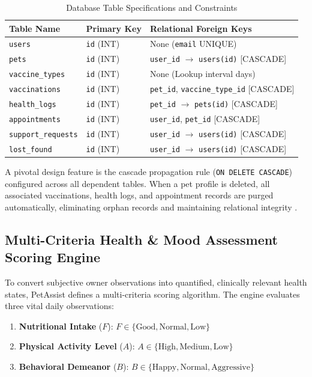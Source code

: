 \documentclass[conference]{IEEEtran}
\begin{document}
\begin{table}[h]
\caption{Database Table Specifications and Constraints}
\label{tab:db_tables}
\centering
\begin{tabular}{lll}
\toprule
\textbf{Table Name} & \textbf{Primary Key} & \textbf{Relational Foreign Keys} \\
\midrule
\texttt{users} & \texttt{id} (INT) & None (\texttt{email} UNIQUE) \\
\texttt{pets} & \texttt{id} (INT) & \texttt{user\_id} $\to$ \texttt{users(id)} [CASCADE] \\
\texttt{vaccine\_types} & \texttt{id} (INT) & None (Lookup interval days) \\
\texttt{vaccinations} & \texttt{id} (INT) & \texttt{pet\_id}, \texttt{vaccine\_type\_id} [CASCADE] \\
\texttt{health\_logs} & \texttt{id} (INT) & \texttt{pet\_id} $\to$ \texttt{pets(id)} [CASCADE] \\
\texttt{appointments} & \texttt{id} (INT) & \texttt{user\_id}, \texttt{pet\_id} [CASCADE] \\
\texttt{support\_requests}& \texttt{id} (INT) & \texttt{user\_id} $\to$ \texttt{users(id)} [CASCADE] \\
\texttt{lost\_found} & \texttt{id} (INT) & \texttt{user\_id} $\to$ \texttt{users(id)} [CASCADE] \\
\bottomrule
\end{tabular}
\end{table}

A pivotal design feature is the cascade propagation rule (\texttt{ON DELETE CASCADE}) configured across all dependent tables. When a pet profile is deleted, all associated vaccinations, health logs, and appointment records are purged automatically, eliminating orphan records and maintaining relational integrity \cite{silberschatz2020}.

\subsection{Multi-Criteria Health \& Mood Assessment Scoring Engine}
To convert subjective owner observations into quantified, clinically relevant health states, PetAssist defines a multi-criteria scoring algorithm. The engine evaluates three vital daily observations:
\begin{enumerate}
    \item \textbf{Nutritional Intake} ($F$): $F \in \{\text{Good}, \text{Normal}, \text{Low}\}$
    \item \textbf{Physical Activity Level} ($A$): $A \in \{\text{High}, \text{Medium}, \text{Low}\}$
    \item \textbf{Behavioral Demeanor} ($B$): $B \in \{\text{Happy}, \text{Normal}, \text{Aggressive}\}$
\end{enumerate}
\end{document}
